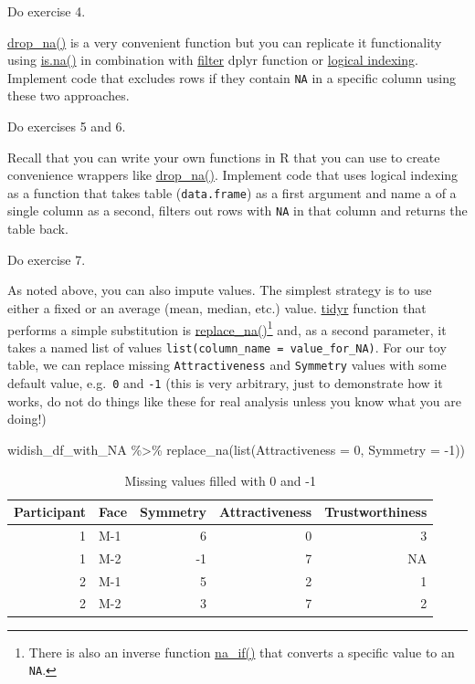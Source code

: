 \documentclass[
]{book}
\newenvironment{Shaded}{\begin{snugshade}}{\end{snugshade}}
\newcommand{\AttributeTok}[1]{\textcolor[rgb]{0.77,0.63,0.00}{#1}}
\newcommand{\DecValTok}[1]{\textcolor[rgb]{0.00,0.00,0.81}{#1}}
\newcommand{\FunctionTok}[1]{\textcolor[rgb]{0.00,0.00,0.00}{#1}}
\newcommand{\NormalTok}[1]{#1}
\newcommand{\SpecialCharTok}[1]{\textcolor[rgb]{0.00,0.00,0.00}{#1}}
\begin{document}
Do exercise 4.

\href{https://tidyr.tidyverse.org/reference/drop_na.html}{drop\_na()} is a very convenient function but you can replicate it functionality using \href{https://stat.ethz.ch/R-manual/R-devel/library/base/html/NA.html}{is.na()} in combination with \href{https://dplyr.tidyverse.org/reference/filter.html}{filter} dplyr function or \href{logical-indexing}{logical indexing}. Implement code that excludes rows if they contain \texttt{NA} in a specific column using these two approaches.

Do exercises 5 and 6.

Recall that you can write your own functions in R that you can use to create convenience wrappers like \href{https://tidyr.tidyverse.org/reference/drop_na.html}{drop\_na()}. Implement code that uses logical indexing as a function that takes table (\texttt{data.frame}) as a first argument and name a of a single column as a second, filters out rows with \texttt{NA} in that column and returns the table back.

Do exercise 7.

As noted above, you can also impute values. The simplest strategy is to use either a fixed or an average (mean, median, etc.) value. \href{https://tidyr.tidyverse.org/}{tidyr} function that performs a simple substitution is \href{https://tidyr.tidyverse.org/reference/replace_na.html}{replace\_na()}\footnote{There is also an inverse function \href{https://dplyr.tidyverse.org/reference/na_if.html}{na\_if()} that converts a specific value to an \texttt{NA}.} and, as a second parameter, it takes a named list of values \texttt{list(column\_name\ =\ value\_for\_NA)}. For our toy table, we can replace missing \texttt{Attractiveness} and \texttt{Symmetry} values with some default value, e.g.~\texttt{0} and \texttt{-1} (this is very arbitrary, just to demonstrate how it works, do not do things like these for real analysis unless you know what you are doing!)

\begin{Shaded}
\begin{Highlighting}[]
\NormalTok{widish\_df\_with\_NA }\SpecialCharTok{\%\textgreater{}\%}
  \FunctionTok{replace\_na}\NormalTok{(}\FunctionTok{list}\NormalTok{(}\AttributeTok{Attractiveness =} \DecValTok{0}\NormalTok{, }\AttributeTok{Symmetry =} \SpecialCharTok{{-}}\DecValTok{1}\NormalTok{)) }
\end{Highlighting}
\end{Shaded}

\begin{table}

\caption{\label{tab:unnamed-chunk-287}Missing values filled with 0 and -1}
\centering
\begin{tabular}[t]{r|l|r|r|r}
\hline
Participant & Face & Symmetry & Attractiveness & Trustworthiness\\
\hline
1 & M-1 & 6 & 0 & 3\\
\hline
1 & M-2 & -1 & 7 & NA\\
\hline
2 & M-1 & 5 & 2 & 1\\
\hline
2 & M-2 & 3 & 7 & 2\\
\hline
\end{tabular}
\end{table}
\end{document}
